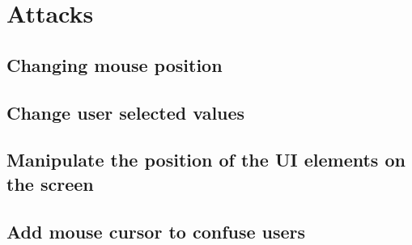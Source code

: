 \section{Attacks}
\label{sec:attacks}

\subsection{Changing mouse position}
\subsection{Change user selected values}
\subsection{Manipulate the position of the UI elements on the screen}
\subsection{Add mouse cursor to confuse users}